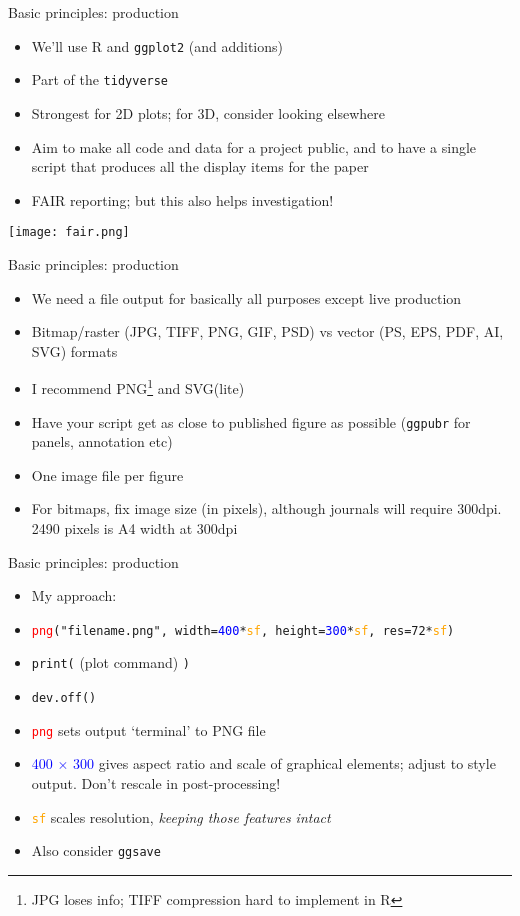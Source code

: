 \documentclass[10pt]{beamer}
\begin{document}
\begin{frame}{Basic principles: production}
    \begin{itemize}
    \item We'll use R and \texttt{ggplot2} (and additions)
      \item Part of the \texttt{tidyverse}
      \item Strongest for 2D plots; for 3D, consider looking elsewhere
            \item Aim to make all code and data for a project public, and to have a single script that produces all the display items for the paper
            \item FAIR reporting; but this also helps investigation!
              
    \end{itemize}
    \texttt{[image: fair.png]}
\end{frame}

\begin{frame}{Basic principles: production}
    \begin{itemize}[<+->]
      \item We need a file output for basically all purposes except live production
    \item Bitmap/raster (JPG, TIFF, PNG, GIF, PSD) vs vector (PS, EPS, PDF, AI, SVG) formats
    \item I recommend PNG\footnote{JPG loses info; TIFF compression hard to implement in R} and SVG(lite)
    \item Have your script get as close to published figure as possible (\texttt{ggpubr} for panels, annotation etc)
    \item One image file per figure
      \item For bitmaps, fix image size (in pixels), although journals will require 300dpi. 2490 pixels is A4 width at 300dpi
  \end{itemize}
\end{frame}

\begin{frame}{Basic principles: production}
    \begin{itemize}
    \item My approach:
    \item[] \texttt{\textcolor{red}{png}("filename.png", width=\textcolor{blue}{400}*\textcolor{orange}{sf}, height=\textcolor{blue}{300}*\textcolor{orange}{sf}, res=72*\textcolor{orange}{sf})}
      \item[] \texttt{print(} (plot command) \texttt{)}
      \item[] \texttt{dev.off()}
      \item \texttt{\textcolor{red}{png}} sets output `terminal' to PNG file
      \item \textcolor{blue}{400 $\times$ 300} gives aspect ratio and scale of graphical elements; adjust to style output. Don't rescale in post-processing!
      \item \texttt{\textcolor{orange}{sf}} scales resolution, \emph{keeping those features intact}
        \item Also consider \texttt{ggsave}
  \end{itemize}
\end{frame}
\end{document}
